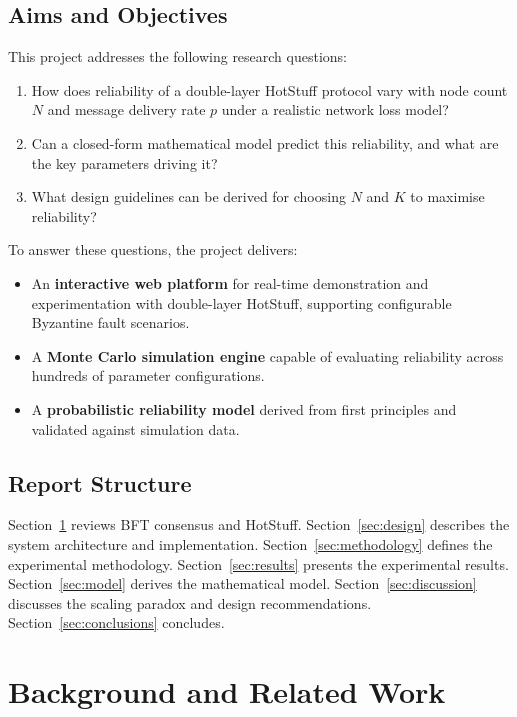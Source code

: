 \documentclass[
12pt,
oneside,
singlespacing,
parskip,
]{article}
\begin{document}
\subsection{Aims and Objectives}

This project addresses the following research questions:

\begin{enumerate}
  \item How does reliability of a double-layer HotStuff protocol vary with node count $N$ and message delivery rate $p$ under a realistic network loss model?
  \item Can a closed-form mathematical model predict this reliability, and what are the key parameters driving it?
  \item What design guidelines can be derived for choosing $N$ and $K$ to maximise reliability?
\end{enumerate}

To answer these questions, the project delivers:

\begin{itemize}
  \item An \textbf{interactive web platform} for real-time demonstration and experimentation with double-layer HotStuff, supporting configurable Byzantine fault scenarios.
  \item A \textbf{Monte Carlo simulation engine} capable of evaluating reliability across hundreds of parameter configurations.
  \item A \textbf{probabilistic reliability model} derived from first principles and validated against simulation data.
\end{itemize}

\subsection{Report Structure}

Section~\ref{sec:background} reviews BFT consensus and HotStuff. Section~\ref{sec:design} describes the system architecture and implementation. Section~\ref{sec:methodology} defines the experimental methodology. Section~\ref{sec:results} presents the experimental results. Section~\ref{sec:model} derives the mathematical model. Section~\ref{sec:discussion} discusses the scaling paradox and design recommendations. Section~\ref{sec:conclusions} concludes.

\section{Background and Related Work}
\label{sec:background}
\end{document}
